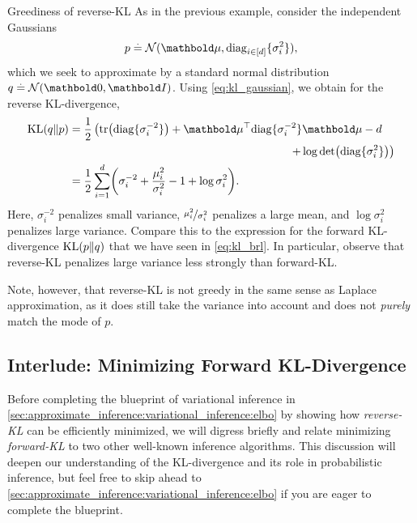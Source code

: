 \begin{rmk}{Greediness of reverse-KL}{}
  As in the previous example, consider the independent Gaussians \begin{align*}
    p \defeq \N{\vmu}{\diag[i\in[d]]{\sigma_i^2}},
  \end{align*} which we seek to approximate by a standard normal distribution ${q \defeq \SN}$.
  Using \eqref{eq:kl_gaussian}, we obtain for the reverse KL-divergence, \begin{align}
    \KL{q}{p} &= \begin{multlined}[t]
      \frac{1}{2} \left(\tr{\diag{\sigma_i^{-2}}} + \transpose{\vmu}\diag{\sigma_i^{-2}}\vmu - d \right. \\ \left. + \log\det{\diag{\sigma_i^2}}\right)
    \end{multlined} \nonumber \\
    &= \frac{1}{2} \sum_{i=1}^d \parentheses*{\sigma_i^{-2} + \frac{\mu_i^2}{\sigma_i^2} - 1 + \log \sigma_i^2}.
  \end{align}
  Here, $\sigma_i^{-2}$ penalizes small variance, $\nicefrac{\mu_i^2}{\sigma_i^2}$ penalizes a large mean, and $\log \sigma_i^2$ penalizes large variance.
  Compare this to the expression for the forward KL-divergence $\KL{p}{q}$ that we have seen in \cref{eq:kl_brl}. In particular, observe that reverse-KL penalizes large variance less strongly than forward-KL.

  Note, however, that reverse-KL is not greedy in the same sense as Laplace approximation, as it does still take the variance into account and does not \emph{purely} match the mode of $p$.
\end{rmk}

\subsection{Interlude: Minimizing Forward KL-Divergence}\label{sec:vi:kl:forward}

Before completing the blueprint of variational inference in \cref{sec:approximate_inference:variational_inference:elbo} by showing how \emph{reverse-KL} can be efficiently minimized, we will digress briefly and relate minimizing \emph{forward-KL} to two other well-known inference algorithms.
This discussion will deepen our understanding of the KL-divergence and its role in probabilistic inference, but feel free to skip ahead to \cref{sec:approximate_inference:variational_inference:elbo} if you are eager to complete the blueprint.

